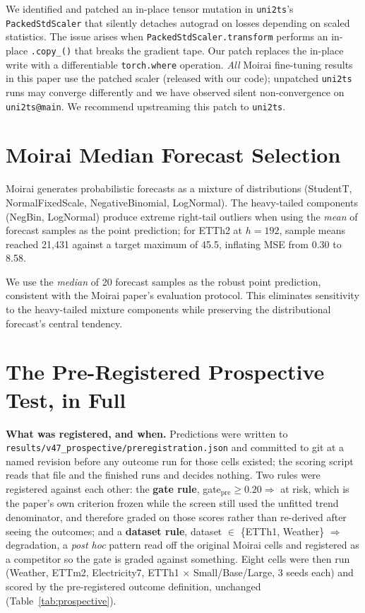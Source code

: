 We identified and patched an in-place tensor mutation in
\texttt{uni2ts}'s \texttt{PackedStdScaler} that silently detaches
autograd on losses depending on scaled statistics.  The issue arises
when \texttt{PackedStdScaler.transform} performs an in-place
\texttt{.copy\_()} that breaks the gradient tape.  Our patch replaces
the in-place write with a differentiable \texttt{torch.where}
operation.  \emph{All} Moirai fine-tuning results in this paper use
the patched scaler (released with our code); unpatched
\texttt{uni2ts} runs may converge differently and we have observed
silent non-convergence on \texttt{uni2ts@main}.  We recommend
upstreaming this patch to \texttt{uni2ts}.

\section{Moirai Median Forecast Selection}
\label{app:moirai_median}

Moirai generates probabilistic forecasts as a mixture of
distributions (StudentT, NormalFixedScale, NegativeBinomial,
LogNormal).  The heavy-tailed components (NegBin, LogNormal) produce
extreme right-tail outliers when using the \emph{mean} of forecast
samples as the point prediction; for ETTh2 at $h{=}192$, sample
means reached 21{,}431 against a target maximum of 45.5, inflating
MSE from 0.30 to 8.58.

We use the \emph{median} of 20 forecast samples as the robust point
prediction, consistent with the Moirai paper's evaluation protocol.
This eliminates sensitivity to the heavy-tailed mixture components
while preserving the distributional forecast's central tendency.

\section{The Pre-Registered Prospective Test, in Full}
\label{app:prospective2}

\textbf{What was registered, and when.} Predictions were written to
\texttt{results/v47\_prospective/preregistration.json} and committed to git at
a named revision before any outcome run for those cells existed; the scoring
script reads that file and the finished runs and decides nothing.
Two rules were registered against each other: the \textbf{gate rule},
gate$_\text{pre}\!\geq\!0.20 \Rightarrow$ at risk, which is the paper's own
criterion frozen while the screen still used the unfitted trend denominator, and
therefore graded on those scores rather than re-derived after seeing the outcomes; and a
\textbf{dataset rule}, dataset ${\in}$ \{ETTh1, Weather\} $\Rightarrow$
degradation, a \emph{post hoc} pattern read off the original Moirai cells and
registered as a competitor so the gate is graded against something.
Eight cells were then run (Weather, ETTm2, Electricity7, ETTh1
$\times$ Small/Base/Large, 3 seeds each) and scored by the pre-registered
outcome definition, unchanged (Table~\ref{tab:prospective}).

